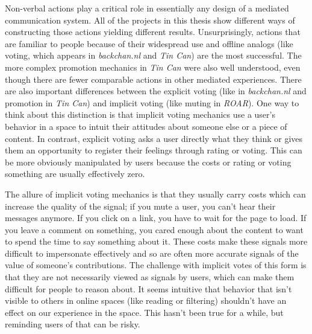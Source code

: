 Non-verbal actions play a critical role in essentially any design of a mediated communication system. All of the projects in this thesis show different ways of constructing those actions yielding different results. Unsurprisingly, actions that are familiar to people because of their widespread use and offline analogs (like voting, which appears in \emph{backchan.nl} and \emph{Tin Can}) are the most successful. The more complex promotion mechanics in \emph{Tin Can} were also well understood, even though there are fewer comparable actions in other mediated experiences. There are also important differences between the explicit voting (like in \emph{backchan.nl} and promotion in \emph{Tin Can}) and implicit voting (like muting in \emph{ROAR}). One way to think about this distinction is that implicit voting mechanics use a user's behavior in a space to intuit their attitudes about someone else or a piece of content.  In contrast, explicit voting asks a user directly what they think or gives them an opportunity to register their feelings through rating or voting. This can be more obviously manipulated by users because the costs or rating or voting something are usually effectively zero.

The allure of implicit voting mechanics is that they usually carry costs which can increase the quality of the signal; if you mute a user, you can't hear their messages anymore. If you click on a link, you have to wait for the page to load. If you leave a comment on something, you cared enough about the content to want to spend the time to say something about it. These costs make these signals more difficult to impersonate effectively and so are often more accurate signals of the value of someone's contributions. The challenge with implicit votes of this form is that they are not necessarily viewed as signals by users, which can make them difficult for people to reason about. It seems intuitive that behavior that isn't visible to others in online spaces (like reading or filtering) shouldn't have an effect on our experience in the space. This hasn't been true for a while, but reminding users of that can be risky.

